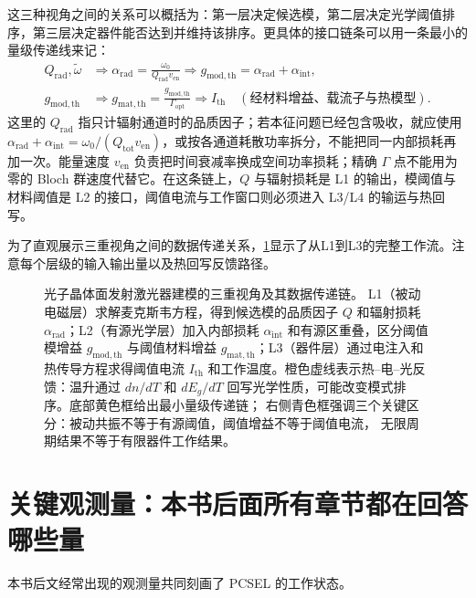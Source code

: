 这三种视角之间的关系可以概括为：第一层决定候选模，第二层决定光学阈值排序，第三层决定器件能否达到并维持该排序。更具体的接口链条可以用一条最小的量级传递线来记：
\begin{equation}
\begin{aligned}
Q_{\mathrm{rad}},\tilde{\omega}
&\Rightarrow
\alpha_{\mathrm{rad}}=\frac{\omega_0}{Q_{\mathrm{rad}}v_{\mathrm{en}}}
\Rightarrow
g_{\mathrm{mod,th}}=\alpha_{\mathrm{rad}}+\alpha_{\mathrm{int}},\\
g_{\mathrm{mod,th}}
&\Rightarrow
g_{\mathrm{mat,th}}=\frac{g_{\mathrm{mod,th}}}{\Gamma_{\mathrm{opt}}}
\Rightarrow
I_{\mathrm{th}}\quad(\text{经材料增益、载流子与热模型}).
\end{aligned}
\end{equation}
这里的 $Q_{\mathrm{rad}}$ 指只计辐射通道时的品质因子；若本征问题已经包含吸收，就应使用 $\alpha_{\mathrm{rad}}+\alpha_{\mathrm{int}}=\omega_0/(Q_{\mathrm{tot}}v_{\mathrm{en}})$，或按各通道耗散功率拆分，不能把同一内部损耗再加一次。能量速度 $v_{\mathrm{en}}$ 负责把时间衰减率换成空间功率损耗；精确 $\Gamma$ 点不能用为零的 Bloch 群速度代替它。在这条链上，$Q$ 与辐射损耗是 L1 的输出，模阈值与材料阈值是 L2 的接口，阈值电流与工作窗口则必须进入 L3/L4 的输运与热回写。

为了直观展示三重视角之间的数据传递关系，\cref{fig:ch01_three_perspectives_flow}显示了从L1到L3的完整工作流。注意每个层级的输入输出量以及热回写反馈路径。

\begin{figure}[htbp]
  \centering
  
  \caption{光子晶体面发射激光器建模的三重视角及其数据传递链。
  L1（被动电磁层）求解麦克斯韦方程，得到候选模的品质因子 $Q$ 和辐射损耗
  $\alpha_{\mathrm{rad}}$；L2（有源光学层）加入内部损耗 $\alpha_{\mathrm{int}}$
  和有源区重叠，区分阈值模增益 $g_{\mathrm{mod,th}}$ 与阈值材料增益
  $g_{\mathrm{mat,th}}$；L3（器件层）通过电注入和热传导方程求得阈值电流
  $I_{\mathrm{th}}$ 和工作温度。橙色虚线表示热--电--光反馈：温升通过
  $dn/dT$ 和 $dE_g/dT$ 回写光学性质，可能改变模式排序。底部黄色框给出最小量级传递链；
  右侧青色框强调三个关键区分：被动共振不等于有源阈值，阈值增益不等于阈值电流，
  无限周期结果不等于有限器件工作结果。}
  \label{fig:ch01_three_perspectives_flow}
\end{figure}

\section{关键观测量：本书后面所有章节都在回答哪些量}
本书后文经常出现的观测量共同刻画了 PCSEL 的工作状态。

